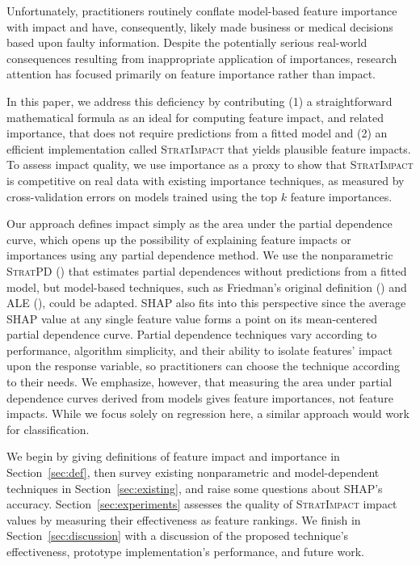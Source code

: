 \documentclass[11pt]{article}
\newcommand{\secref}[1]{Section~\ref{#1}}
\newcommand{\todo}[1]{{{\small\color{red}{[#1]}}}}
\newcommand{\simp}{\fontfamily{cmr}\textsc{\small StratImpact}}
\newcommand{\spd}{\fontfamily{cmr}\textsc{\small StratPD}}
\begin{document}
Unfortunately, practitioners routinely conflate model-based feature importance with impact and have, consequently, likely made business or medical decisions based upon faulty information. Despite the potentially serious real-world consequences resulting from inappropriate application of importances, research attention has focused primarily on feature importance rather than impact. 

In this paper, we address this deficiency by contributing (1) a straightforward mathematical formula as an ideal for computing feature impact, and related importance, that does not require predictions from a fitted model and (2) an efficient implementation called \simp{} that yields plausible feature impacts. To assess impact quality, we use importance as a proxy to show that \simp{} is competitive on real data with existing importance techniques, as measured by cross-validation errors on models trained using the top $k$ feature importances.  

Our approach defines impact simply as the area under the partial dependence curve, which opens up the possibility of explaining feature impacts or importances using any partial dependence method.  We use the nonparametric \spd{} (\citealt{stratpd}) that estimates partial dependences without predictions from a fitted model, but model-based techniques, such as Friedman's original definition (\citealt{PDP}) and ALE (\citealt{apley2016visualizing}), could be adapted.  SHAP also fits into this perspective since the average SHAP value at any single feature value forms a point on its mean-centered partial dependence curve. Partial dependence techniques vary according to performance, algorithm simplicity, and their ability to isolate features' impact upon the response variable, so practitioners can choose the technique according to their needs. \todo{impl language. what if they don't want a model?} We emphasize, however, that measuring the area under partial dependence curves derived from models gives feature importances, not feature impacts. While we focus solely on regression here, a similar approach would work for classification.

We begin by giving definitions of feature impact and importance in \secref{sec:def}, then survey existing nonparametric and model-dependent techniques in \secref{sec:existing}, and raise some questions about SHAP's accuracy. \secref{sec:experiments} assesses the quality of \simp{} impact values by measuring their effectiveness as feature rankings. We finish in \secref{sec:discussion} with a discussion of the proposed technique's effectiveness, prototype implementation's performance, and future work.
\end{document}
